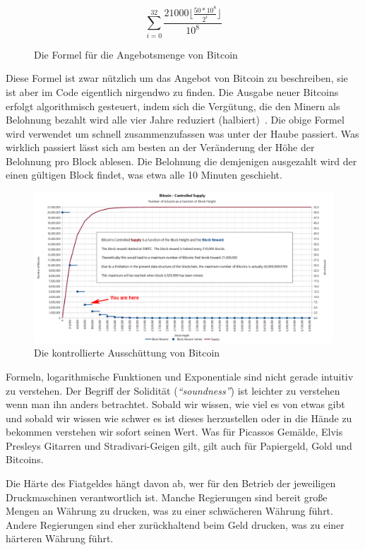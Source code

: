 \begin{figure}
  \centering
  \begin{equation}
  \sum\limits_{i=0}^{32} \frac{21000 \lfloor \frac{50*10^8}{2^i} \rfloor}{10^8}
  \end{equation}
  \caption{Die Formel für die Angebotsmenge von Bitcoin}
  \label{fig:supply-formula-white}
\end{figure}

Diese Formel ist zwar nützlich um das Angebot von Bitcoin zu beschreiben, sie
ist aber im Code eigentlich nirgendwo zu finden. Die Ausgabe neuer Bitcoins
erfolgt algorithmisch gesteuert, indem sich die Vergütung, die den Minern als
Belohnung bezahlt wird alle vier Jahre reduziert
(halbiert)~\cite{btcwiki:supply}. Die obige Formel wird verwendet um schnell
zusammenzufassen was unter der Haube passiert. Was wirklich passiert lässt sich
am besten an der Veränderung der Höhe der Belohnung pro Block ablesen. Die
Belohnung die demjenigen ausgezahlt wird der einen gültigen Block findet, was
etwa alle 10 Minuten geschieht.

\begin{figure}
  \includegraphics{assets/images/you-are-here.png}
  \caption{Die kontrollierte Ausschüttung von Bitcoin}
  \label{fig:you-are-here.png}
\end{figure}

Formeln, logarithmische Funktionen und Exponentiale sind nicht gerade intuitiv
zu verstehen. Der Begriff der Solidität (\textit{\enquote{soundness}}) ist
leichter zu verstehen wenn man ihn anders betrachtet. Sobald wir wissen, wie
viel es von etwas gibt und sobald wir wissen wie schwer es ist dieses
herzustellen oder in die Hände zu bekommen verstehen wir sofort seinen Wert. Was
für Picassos Gemälde, Elvis Presleys Gitarren und Stradivari-Geigen gilt, gilt
auch für Papiergeld, Gold und Bitcoins.

Die Härte des Fiatgeldes hängt davon ab, wer für den Betrieb der jeweiligen
Druckmaschinen verantwortlich ist. Manche Regierungen sind bereit große Mengen
an Währung zu drucken, was zu einer schwächeren Währung führt. Andere
Regierungen sind eher zurückhaltend beim Geld drucken, was zu einer härteren
Währung führt.

